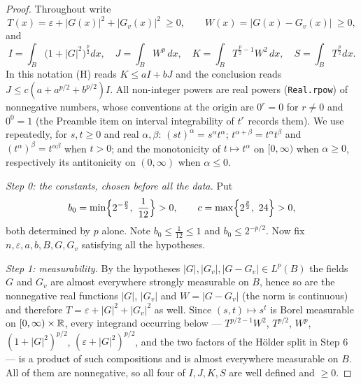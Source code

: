 \begin{proof}
Throughout write
\[
T(x)=\varepsilon+|G(x)|^2+|G_v(x)|^2\ \ge0,
\qquad
W(x)=|G(x)-G_v(x)|\ \ge0,
\]
and
\[
I=\int_B\bigl(1+|G|^2\bigr)^{\frac p2}dx,\quad
J=\int_BW^p\,dx,\quad
K=\int_BT^{\frac p2-1}W^2\,dx,\quad
S=\int_BT^{\frac p2}dx .
\]
In this notation (H) reads $K\le aI+bJ$ and the conclusion reads
$J\le c(a+a^{p/2}+b^{p/2})I$.  All non-integer powers are real powers
(\texttt{Real.rpow}) of nonnegative numbers, whose conventions at the origin are
$0^{r}=0$ for $r\ne0$ and $0^{0}=1$ (the Preamble item on interval
integrability of $t^{r}$ records them).  We use repeatedly, for $s,t\ge0$ and
real $\alpha,\beta$: $(st)^{\alpha}=s^{\alpha}t^{\alpha}$;
$t^{\alpha+\beta}=t^{\alpha}t^{\beta}$ and $(t^{\alpha})^{\beta}=t^{\alpha\beta}$
when $t>0$; and the monotonicity of $t\mapsto t^{\alpha}$ on $[0,\infty)$ when
$\alpha\ge0$, respectively its antitonicity on $(0,\infty)$ when $\alpha\le0$.

\emph{Step 0: the constants, chosen before all the data.}  Put
\[
b_0=\min\Bigl\{2^{-\frac p2},\ \frac1{12}\Bigr\}>0,
\qquad
c=\max\Bigl\{2^{\frac p2},\ 24\Bigr\}>0 ,
\]
both determined by $p$ alone.  Note $b_0\le\frac1{12}\le1$ and
$b_0\le2^{-p/2}$.  Now fix $n,\varepsilon,a,b,B,G,G_v$ satisfying all the
hypotheses.

\emph{Step 1: measurability.}  By the hypotheses $|G|,|G_v|,|G-G_v|\in L^p(B)$
the fields $G$ and $G_v$ are almost everywhere strongly measurable on $B$, hence
so are the nonnegative real functions $|G|$, $|G_v|$ and $W=|G-G_v|$ (the norm
is continuous) and therefore $T=\varepsilon+|G|^2+|G_v|^2$ as well.  Since
$(s,t)\mapsto s^{t}$ is Borel measurable on $[0,\infty)\times\mathbb{R}$, every
integrand occurring below --- $T^{p/2-1}W^2$, $T^{p/2}$, $W^p$,
$(1+|G|^2)^{p/2}$, $(\varepsilon+|G|^2)^{p/2}$, and the two factors of the
H\"older split in Step 6 --- is a product of such compositions and is almost
everywhere measurable on $B$.  All of them are nonnegative, so all four of
$I,J,K,S$ are well defined and $\ge0$.


\end{proof}
